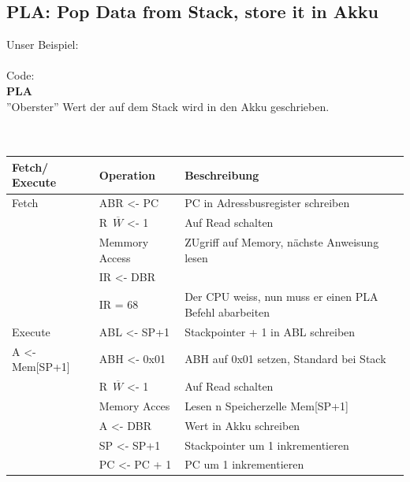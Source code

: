 \documentclass[a4paper,10pt]{report}
\begin{document}
\subsection{PLA: Pop Data from Stack, store it in Akku}
Unser Beispiel: \\
\\
Code:
\\
\textbf{PLA}
\\
''Oberster'' Wert der auf dem Stack wird in den Akku geschrieben.\\
\\
\\
\begin{tabularx}{\textwidth}{l|l|X}
Fetch/ Execute & Operation & Beschreibung \\ \hline 
Fetch& ABR <- PC &  PC in Adressbusregister schreiben\\
&R\ $\overline{W}$ <- 1& Auf Read schalten\\
&Memmory Access& ZUgriff auf Memory, nächste Anweisung lesen\\
&IR <- DBR&\\
&IR = 68& Der CPU weiss, nun muss er einen PLA Befehl abarbeiten \\
Execute&ABL <- SP+1& Stackpointer + 1 in ABL schreiben\\
A <- Mem[SP+1]&ABH <- 0x01& ABH auf 0x01 setzen, Standard bei Stack\\
&R\ $\overline{W}$ <- 1& Auf Read schalten\\
&Memory Acces& Lesen n Speicherzelle Mem[SP+1]\\
&A <- DBR& Wert in Akku schreiben\\
&SP <- SP+1& Stackpointer um 1 inkrementieren\\
&PC <- PC + 1& PC um 1 inkrementieren\\
\end{tabularx}
\end{document}
